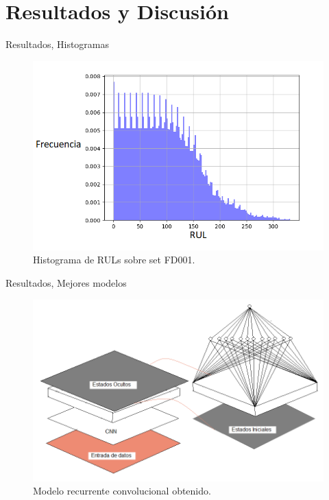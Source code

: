 \section{Resultados y Discusión}
\begin{frame}{Resultados, Histogramas}
\begin{figure}
    \centering
    \includegraphics[scale=0.5]{animate/histograma_FD001(mejorado).png}
    \caption{Histograma de RULs sobre set FD001.}
    \label{fig:hist1}
\end{figure}
\end{frame}

\begin{frame}{Resultados, Mejores modelos}
    \begin{figure}
        \centering
        \includegraphics[scale=0.48]{animate/modelo_winer.png}
        \caption{Modelo recurrente convolucional obtenido.}
        \label{fig:my_label}
    \end{figure}
\end{frame}

